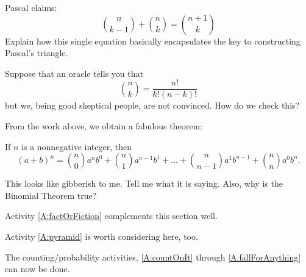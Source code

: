\begin{question}
Pascal claims:
\[
\binom{n}{k-1} +  \binom{n}{k} = \binom{n+1}{k}
\]
Explain how this single equation basically encapsulates the key
to constructing Pascal's triangle.
\end{question}
\QM

\begin{question}
Suppose that an oracle tells you that
\[
\binom{n}{k} = \frac{n!}{k!(n-k)!}
\]
but we, being good skeptical people, are not convinced. How do we
check this?
\end{question}
\QM

From the work above, we obtain a fabulous theorem:


\begin{theorem} 
If $n$ is a nonnegative integer, then
\[
(a+b)^n = \binom{n}{0} a^nb^0 + \binom{n}{1} a^{n-1}b^1 + \dots + \binom{n}{n-1} a^{1}b^{n-1} + \binom{n}{n} a^{0}b^n.   
\]
\end{theorem}


\begin{question} 
This looks like gibberish to me. Tell me what it is saying. Also, why
is the Binomial Theorem true?
\end{question}
\QM



\begin{activitynote}
Activity \ref{A:factOrFiction} complements this section well.  %
\end{activitynote}


\begin{activitynote}
Activity \ref{A:pyramid} is worth considering here, too.  %
\end{activitynote}


\begin{activitynote}
The counting/probability activities, \ref{A:countOnIt} through \ref{A:fallForAnything} can now be done.
\end{activitynote}



